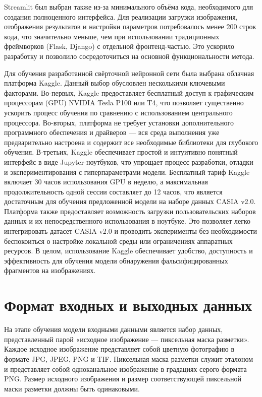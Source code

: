 Streamlit был выбран также из-за минимального объёма кода, необходимого для создания полноценного интерфейса. Для реализации загрузки изображения, отображения результатов и настройки параметров потребовалось менее 200 строк кода, что значительно меньше, чем при использовании традиционных фреймворков (Flask, Django) с отдельной фронтенд-частью. Это ускорило разработку и позволило сосредоточиться на основной функциональности метода.

Для обучения разработанной свёрточной нейронной сети была выбрана облачная платформа Kaggle. Данный выбор обусловлен несколькими ключевыми факторами. Во-первых, Kaggle предоставляет бесплатный доступ к графическим процессорам (GPU) NVIDIA Tesla P100 или T4, что позволяет существенно ускорить процесс обучения по сравнению с использованием центрального процессора. Во-вторых, платформа не требует установки дополнительного программного обеспечения и драйверов — вся среда выполнения уже предварительно настроена и содержит все необходимые библиотеки для глубокого обучения. В-третьих, Kaggle обеспечивает простой и интуитивно понятный интерфейс в виде Jupyter-ноутбуков, что упрощает процесс разработки, отладки и экспериментирования с гиперпараметрами модели. Бесплатный тариф Kaggle включает 30 часов использования GPU в неделю, а максимальная продолжительность одной сессии составляет до 12 часов, что является достаточным для обучения предложенной модели на наборе данных CASIA v2.0. Платформа также предоставляет возможность загрузки пользовательских наборов данных и их непосредственного использования в ноутбуке. Это позволяет легко интегрировать датасет CASIA v2.0 и проводить эксперименты без необходимости беспокоиться о настройке локальной среды или ограничениях аппаратных ресурсов. В целом, использование Kaggle обеспечивает удобство, доступность и эффективность для обучения модели обнаружения фальсифицированных фрагментов на изображениях.

\section{Формат входных и выходных данных}

На этапе обучения модели входными данными является набор данных, представленный парой «исходное изображение --- пиксельная маска разметки». Каждое исходное изображение представляет собой цветную фотографию в формате JPG, JPEG, PNG и TIF. Пиксельная маска разметки служит эталоном и представляет собой одноканальное изображение в градациях серого формата PNG. Размер исходного изображения и размер соответствующей пиксельной маски разметки должны быть одинаковыми.

